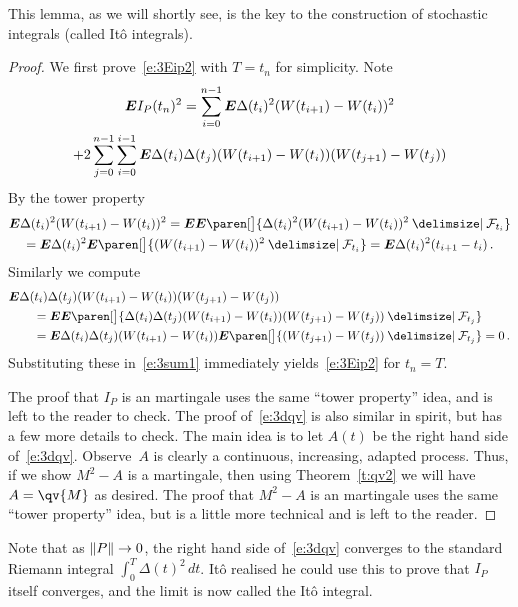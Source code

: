 This lemma, as we will shortly see, is the key to the construction of stochastic integrals (called It\^o integrals).
\begin{proof}%
  We first prove~\eqref{e:3Eip2} with $T = t_n$ for simplicity.
  Note
  \begin{multline}\label{e:3sum1}
    \bm{E} I_P(t_n)^2 
      = \sum_{i=0}^{n-1}
	  \bm{E} \Delta(t_i)^2 (W(t_{i+1}) - W(t_i))^2
    \\
	+ 2 \sum_{j=0}^{n-1}
	  \sum_{i=0}^{i-1}
	  \bm{E} \Delta(t_i) \Delta(t_j)
	    (W(t_{i+1}) - W(t_i))
	    (W(t_{j+1}) - W(t_j))
  \end{multline}
  By the tower property
  \begin{multline*}
    \E \Delta(t_i)^2 (W(t_{i+1}) - W(t_i))^2
      = \E \E \paren[\big]{ \Delta(t_i)^2 (W(t_{i+1}) - W(t_i))^2 \given \mathcal F_{t_i} }
    \\
      = \E \Delta(t_i)^2 \E \paren[\big]{ (W(t_{i+1}) - W(t_i))^2 \given \mathcal F_{t_i} }
      = \E \Delta(t_i)^2 (t_{i+1} - t_i)\,.
  \end{multline*}
  Similarly we compute
  \begin{align*}
    \MoveEqLeft
    \E \Delta(t_i) \Delta(t_j)
      (W(t_{i+1}) - W(t_i))
      (W(t_{j+1}) - W(t_j))
    \\
    &= \E \E \paren[\big]{ \Delta(t_i) \Delta(t_j)
      (W(t_{i+1}) - W(t_i))
      (W(t_{j+1}) - W(t_j)) \given \mathcal F_{t_j} }
    \\
    &= \E \Delta(t_i) \Delta(t_j)
	  (W(t_{i+1}) - W(t_i))
	  \E \paren[\big]{ (W(t_{j+1}) - W(t_j)) \given \mathcal F_{t_j} }
    = 0\,.
  \end{align*}
  Substituting these in~\eqref{e:3sum1} immediately yields~\eqref{e:3Eip2} for $t_n = T$.

  The proof that $I_P$ is an martingale uses the same ``tower property'' idea, and is left to the reader to check.
  The proof of~\eqref{e:3dqv} is also similar in spirit, but has a few more details to check.
  The main idea is to let $A(t)$ be the right hand side of~\eqref{e:3dqv}.
  Observe~$A$ is clearly a continuous, increasing, adapted process.
  Thus, if we show $M^2 - A$ is a martingale, then using Theorem~\ref{t:qv2} we will have $A = \qv{M}$ as desired.
  The proof that $M^2 - A$ is an martingale uses the same ``tower property'' idea, but is a little more technical and is left to the reader.
\end{proof}

Note that as $\lVert P\rVert \to 0$, the right hand side of~\eqref{e:3dqv} converges to the standard Riemann integral $\int_0^T \Delta(t)^2 \, dt$.
It\^o realised he could use this to prove that $I_P$ itself converges, and the limit is now called the It\^o integral.

